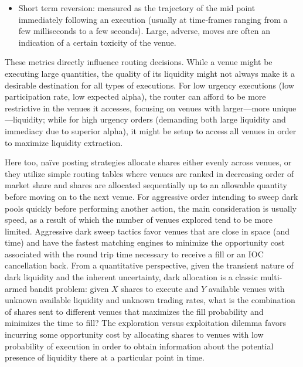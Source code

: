 \begin{itemize}
\begin{itemize}
\item Short term reversion: measured as the trajectory of the mid point immediately following an execution (usually at time-frames ranging from a few milliseconds to a few seconds). Large, adverse, moves are often an indication of a certain toxicity of the venue. 
\end{itemize}


These metrics directly influence routing decisions. While a venue might be executing large quantities, the quality of its liquidity might not always make it a desirable destination for all types of executions. For low urgency executions (low participation rate, low expected alpha), the router can afford to be more restrictive in the venues it accesses, focusing on venues with larger---more unique---liquidity; while for high urgency orders (demanding both large liquidity and immediacy due to superior alpha), it might be setup to access all venues in order to maximize liquidity extraction.


Here too, na\"ive posting strategies allocate shares either evenly across venues, or they utilize simple routing tables where venues are ranked in decreasing order of market share and shares are allocated sequentially up to an allowable quantity before moving on to the next venue. For aggressive order intending to sweep dark pools quickly before performing another action, the main consideration is usually speed, as a result of which the number of venues explored tend to be more limited. Aggressive dark sweep tactics favor venues that are close in space (and time) and have the fastest matching engines to minimize the opportunity cost associated with the round trip time necessary to receive a fill or an IOC cancellation back. From a quantitative perspective, given the transient nature of dark liquidity and the inherent uncertainty, dark allocation is a classic multi-armed bandit problem: given $X$ shares to execute and $Y$ available venues with unknown available liquidity and unknown trading rates, what is the combination of shares sent to different venues that maximizes the fill probability and minimizes the time to fill? The exploration versus exploitation dilemma favors incurring some opportunity cost by allocating shares to venues with low probability of execution in order to obtain information about the potential presence of liquidity there at a particular point in time.



\end{itemize}
